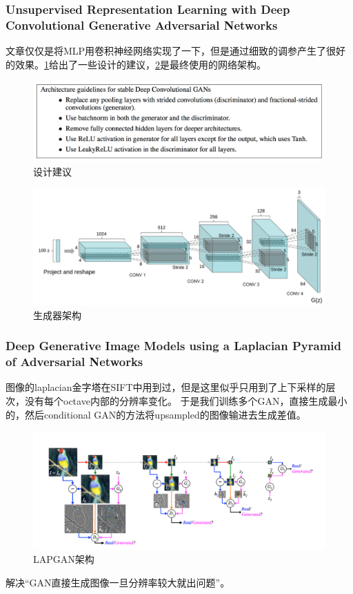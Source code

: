 \documentclass[a4paper]{article}
\begin{document}
\subsubsection{Unsupervised Representation Learning with Deep Convolutional Generative Adversarial Networks\cite{DBLP:journals/corr/RadfordMC15}}
文章仅仅是将MLP用卷积神经网络实现了一下，但是通过细致的调参产生了很好的效果。\ref{fig:9}给出了一些设计的建议，\ref{fig:10}是最终使用的网络架构。
\begin{figure}
\centering
\includegraphics[width=\textwidth]{./img/9.png}
\caption{设计建议}
\label{fig:9}
\end{figure}
\begin{figure}
\centering
\includegraphics[width=\textwidth]{./img/10.png}
\caption{生成器架构}
\label{fig:10}
\end{figure}
\subsubsection{Deep Generative Image Models using a Laplacian Pyramid of Adversarial Networks\cite{DBLP:journals/corr/DentonCSF15}}
图像的laplacian金字塔在SIFT中用到过，但是这里似乎只用到了上下采样的层次，没有每个octave内部的分辨率变化。
于是我们训练多个GAN，直接生成最小的，然后conditional GAN的方法将upsampled的图像输进去生成差值。

\begin{figure}
\centering
\includegraphics[width=\textwidth]{./img/15.png}
\caption{LAPGAN架构}
\label{fig:15}
\end{figure}解决“GAN直接生成图像一旦分辨率较大就出问题”。
\end{document}
